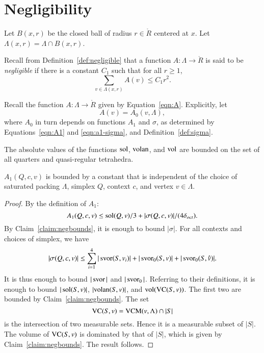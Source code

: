 \section{Negligibility} \label{sec:negligible}

Let $B(x,r)$ be the closed ball of radius $r\in\ring{R}$ centered
at $x$.  Let $\Lambda(x,r)=\Lambda\cap B(x,r)$.

Recall from Definition~\ref{def:negligible} that a function
$A:\Lambda\to\ring{R}$ is said to be {\it negligible} if there is a
constant $C_1$ such that for all $r\ge1$,
   $$\sum_{v\in\Lambda(x,r) } A(v) \le C_1 r^2.$$
%


Recall the function $A: \Lambda\to\ring{R}$ given by
Equation~\ref{eqn:A}.  Explicitly, let
   $$A(v) = A_0(v,\Lambda),$$
where $A_0$ in turn depends on functions $A_1$ and $\sigma$, as
determined by Equations~\ref{eqn:A1} and \ref{eqn:a1-sigma}, and
Definition~\ref{def:sigma}.

\begin{claim}\label{claim:negbounds}
    The absolute values of the functions $\operatorname{sol}$, ${\operatorname{volan}}$, and ${\operatorname{vol}}$
are bounded on the set of all quarters and
    quasi-regular tetrahedra.
\end{claim}


\begin{lemma}\label{lemma:A1bound}  $A_1(Q,c,v)$ is bounded by a constant that is
independent of the choice of saturated packing $\Lambda$, simplex
$Q$, context $c$, and vertex $v\in\Lambda$.
\end{lemma}

\begin{proof} By the definition of $A_1$:
    $$
    A_1(Q,c,v) \le \operatorname{sol}(Q,v)/3 + |\sigma(Q,c,v)|/(4\delta_{oct}).
    $$
By Claim~\ref{claim:negbounds}, it is enough to bound $|\sigma|$.
For all contexts and choices of simplex, we have
    $$|\sigma(Q,c,v)|\le \sum_{i=1}^4 |\operatorname{svor}(S,v_i)| +
        |\operatorname{svor}_0(S,v)| + |\operatorname{svor}_0(S,\hat v)|.
    $$
It is thus enough to bound $|\operatorname{svor}|$ and $|\operatorname{svor}_0|$.  Referring
to their definitions, it is enough to bound $|\operatorname{sol}(S,v)|$,
$|{\operatorname{volan}}(S,v)|$, and ${\operatorname{vol}}({\operatorname{VC}}(S,v))$. The first two
are bounded by Claim~\ref{claim:negbounds}.  The set
    $${\operatorname{VC}}(S,v) = {\operatorname{VCM}}(v,\Lambda)\cap |S|$$
is the intersection of two measurable sets.  Hence it is a
measurable subset of $|S|$.  The volume of ${\operatorname{VC}}(S,v)$ is
dominated by that of $|S|$, which is given by
Claim~\ref{claim:negbounds}.  The result follows.
\end{proof}

